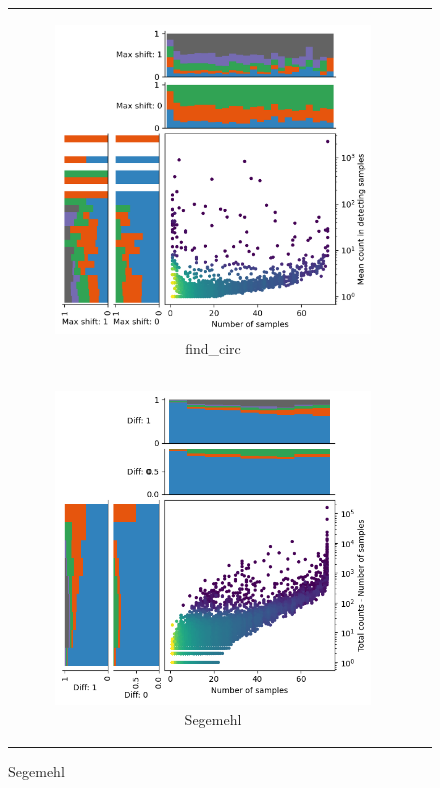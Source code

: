 \begin{figure}[H]
\begin{tabular}{cc}
\begin{subfigure}{.4\textwidth}
                       \includegraphics[width=\linewidth]{chapters/4_results_and_discussion/figures/detection/density/find_circ.png}
                       \caption{find\_circ}
                       \label{fig:detection_density_find-circ} \end{subfigure}
               \\ \begin{subfigure}{.4\textwidth} \centering

            \includegraphics[width=\linewidth]{chapters/4_results_and_discussion/figures/detection/density/segemehl.png}
            \caption{Segemehl} \label{fig:detection_density_segemehl}
        \end{subfigure}


\end{tabular}
\end{figure}
